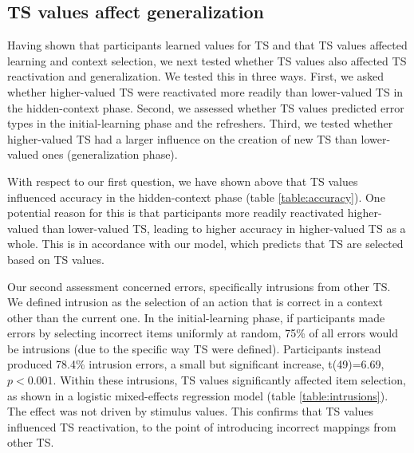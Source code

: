 \documentclass[10pt, letterpaper]{article}
\begin{document}
\subsection{TS values affect generalization}

Having shown that participants learned values for TS and that TS values affected learning and context selection, we next tested whether TS values also affected TS reactivation and generalization. We tested this in three ways. First, we asked whether higher-valued TS were reactivated more readily than lower-valued TS in the hidden-context phase. Second, we assessed whether TS values predicted error types in the initial-learning phase and the refreshers. Third, we tested whether higher-valued TS had a larger influence on the creation of new TS than lower-valued ones (generalization phase).

With respect to our first question, we have shown above that TS values influenced accuracy in the hidden-context phase (table \ref{table:accuracy}). One potential reason for this is that participants more readily reactivated higher-valued than lower-valued TS, leading to higher accuracy in higher-valued TS as a whole. This is in accordance with our model, which predicts that TS are selected based on TS values.

Our second assessment concerned errors, specifically intrusions from other TS. We defined intrusion as the selection of an action that is correct in a context other than the current one. In the initial-learning phase, if participants made errors by selecting incorrect items uniformly at random, 75\% of all errors would be intrusions (due to the specific way TS were defined). Participants instead produced 78.4\% intrusion errors, a small but significant increase, t(49)=6.69, $p<0.001$. Within these intrusions, TS values significantly affected item selection, as shown in a logistic mixed-effects regression model (table \ref{table:intrusions}). The effect was not driven by stimulus values. This confirms that TS values influenced TS reactivation, to the point of introducing incorrect mappings from other TS.
\end{document}
